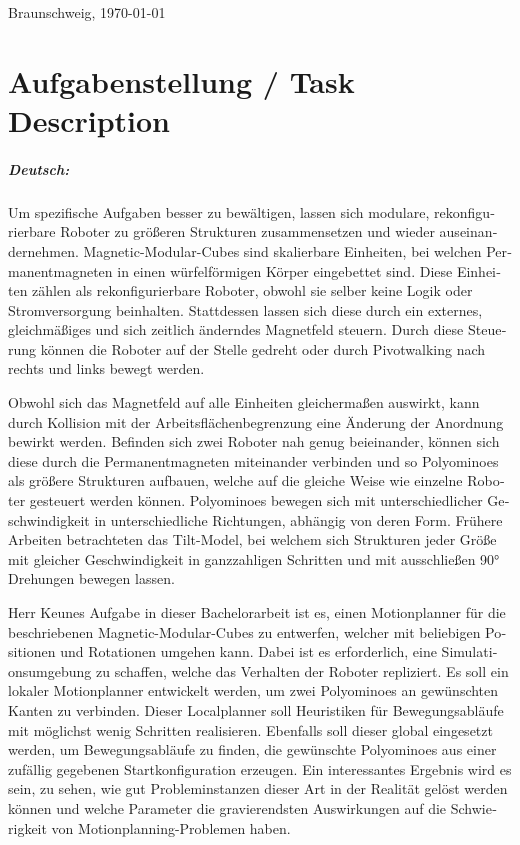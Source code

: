 \documentclass[11pt,a4paper,twoside,titlepage]{scrbook}
\theoremstyle{definition}
\begin{document}
	\par
	\bigskip\noindent Braunschweig, \today \par
	\vspace*{10mm}
	\hfill\hrulefill
	\cleardoublepage
	
	
	\chapter*{Aufgabenstellung / Task Description}


\paragraph{Deutsch:}
\begin{otherlanguage}{ngerman}
	Um spezifische Aufgaben besser zu bewältigen, lassen sich modulare, rekonfigurierbare Roboter zu größeren Strukturen zusammensetzen und wieder auseinandernehmen.
	Magnetic-Modular-Cubes sind skalierbare Einheiten, bei welchen Permanentmagneten in einen würfelförmigen Körper eingebettet sind.
	Diese Einheiten zählen als rekonfigurierbare Roboter, obwohl sie selber keine Logik oder Stromversorgung beinhalten.
	Stattdessen lassen sich diese durch ein externes, gleichmäßiges und sich zeitlich änderndes Magnetfeld steuern.
	Durch diese Steuerung können die Roboter auf der Stelle gedreht oder durch Pivotwalking nach rechts und links bewegt werden.
	
	Obwohl sich das Magnetfeld auf alle Einheiten gleichermaßen auswirkt, kann durch Kollision mit der Arbeitsflächenbegrenzung eine Änderung der Anordnung bewirkt werden.
	Befinden sich zwei Roboter nah genug beieinander, können sich diese durch die Permanentmagneten miteinander verbinden und so Polyominoes als größere Strukturen aufbauen, welche auf die gleiche Weise wie einzelne Roboter gesteuert werden können.
	Polyominoes bewegen sich mit unterschiedlicher Geschwindigkeit in unterschiedliche Richtungen, abhängig von deren Form.
	Frühere Arbeiten betrachteten das Tilt-Model, bei welchem sich Strukturen jeder Größe mit gleicher Geschwindigkeit in ganzzahligen Schritten und mit ausschließen 90° Drehungen bewegen lassen.
	
	Herr Keunes Aufgabe in dieser Bachelorarbeit ist es, einen Motionplanner für die beschriebenen Magnetic-Modular-Cubes zu entwerfen, welcher mit beliebigen Positionen und Rotationen umgehen kann.
	Dabei ist es erforderlich, eine Simulationsumgebung zu schaffen, welche das Verhalten der Roboter repliziert.
	Es soll ein lokaler Motionplanner entwickelt werden, um zwei Polyominoes an gewünschten Kanten zu verbinden.
	Dieser Localplanner soll Heuristiken für Bewegungsabläufe mit möglichst wenig Schritten realisieren.
	Ebenfalls soll dieser global eingesetzt werden, um Bewegungsabläufe zu finden, die gewünschte Polyominoes aus einer zufällig gegebenen Startkonfiguration erzeugen.
	Ein interessantes Ergebnis wird es sein, zu sehen, wie gut Probleminstanzen dieser Art in der Realität gelöst werden können und welche Parameter die gravierendsten Auswirkungen auf die Schwierigkeit von Motionplanning-Problemen haben.
	
\end{otherlanguage}
\end{document}
